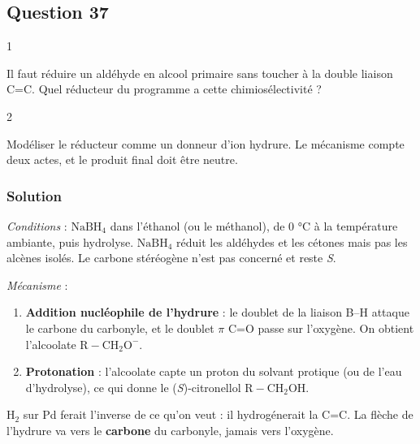 \documentclass[11pt,a4paper]{article}
\providecommand{\tightlist}{\setlength{\itemsep}{0pt}\setlength{\parskip}{0pt}}
\begin{document}
\hypertarget{question-37}{%
\subsection{Question 37}\label{question-37}}

\begin{indication}{1}

Il faut réduire un aldéhyde en alcool primaire sans toucher à la double liaison C=C. Quel réducteur du programme a cette chimiosélectivité ?

\end{indication}

\begin{indication}{2}

Modéliser le réducteur comme un donneur d'ion hydrure. Le mécanisme compte deux actes, et le produit final doit être neutre.

\end{indication}

\hypertarget{solution-36}{%
\subsubsection{Solution}\label{solution-36}}

\emph{Conditions} : \(\mathrm{NaBH_4}\) dans l'éthanol (ou le méthanol), de 0 °C à la température ambiante, puis hydrolyse. \(\mathrm{NaBH_4}\) réduit les aldéhydes et les cétones mais pas les alcènes isolés. Le carbone stéréogène n'est pas concerné et reste \emph{S}.

\emph{Mécanisme} :

\begin{enumerate}
\def\labelenumi{\arabic{enumi}.}
\tightlist
\item
  \textbf{Addition nucléophile de l'hydrure} : le doublet de la liaison B--H attaque le carbone du carbonyle, et le doublet \(\pi\) C=O passe sur l'oxygène. On obtient l'alcoolate \(\mathrm{R{-}CH_2O^-}\).
\item
  \textbf{Protonation} : l'alcoolate capte un proton du solvant protique (ou de l'eau d'hydrolyse), ce qui donne le (\emph{S})-citronellol \(\mathrm{R{-}CH_2OH}\).
\end{enumerate}

\begin{piege}

\(\mathrm{H_2}\) sur Pd ferait l'inverse de ce qu'on veut : il hydrogénerait la C=C. La flèche de l'hydrure va vers le \textbf{carbone} du carbonyle, jamais vers l'oxygène.

\end{piege}
\end{document}
